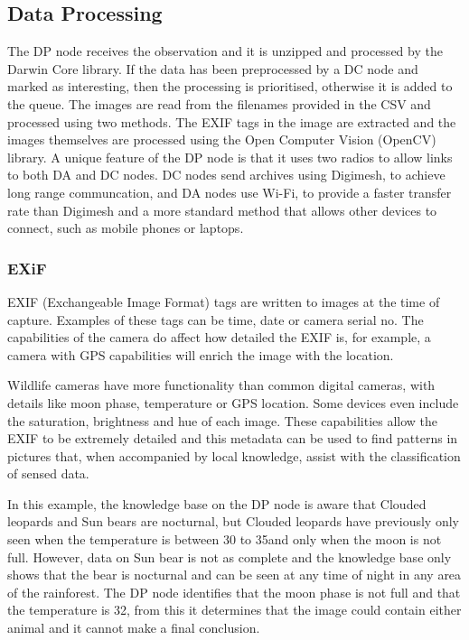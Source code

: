 	\subsection{Data Processing}			
			The DP node receives the observation and it is unzipped and processed by the Darwin Core library. If the data has been preprocessed by a DC node and marked as interesting, then the processing is prioritised, otherwise it is added to the queue. The images are read from the filenames provided in the CSV and processed using two methods. The EXIF tags in the image are extracted and the images themselves are processed using the Open Computer Vision (OpenCV) library. A unique feature of the DP node is that it uses two radios to allow links to both DA and DC nodes. DC nodes send archives using Digimesh, to achieve long range communcation, and DA nodes use Wi-Fi, to provide a faster transfer rate than Digimesh and a more standard method that allows other devices to connect, such as mobile phones or laptops.
			
		\subsubsection{EXiF}
			EXIF (Exchangeable Image Format) tags are written to images at the time of capture. Examples of these tags can be time, date or camera serial no. The capabilities of the camera do affect how detailed the EXIF is, for example, a camera with GPS capabilities will enrich the image with the location. 
			
			Wildlife cameras have more functionality than common digital cameras, with details like moon phase, temperature or GPS location. Some devices even include the saturation, brightness and hue of each image. These capabilities allow the EXIF to be extremely detailed and this metadata can be used to find patterns in pictures that, when accompanied by local knowledge, assist with the classification of sensed data. 
			
			In this example, the knowledge base on the DP node is aware that Clouded leopards and Sun bears are nocturnal, but Clouded leopards have previously only seen when the temperature is between 30 to 35\celsius and only when the moon is not full. However, data on Sun bear is not as complete and the knowledge base only shows that the bear is nocturnal and can be seen at any time of night in any area of the rainforest. The DP node identifies that the moon phase is not full and that the temperature is 32\celsius, from this it determines that the image could contain either animal and it cannot make a final conclusion.
			
